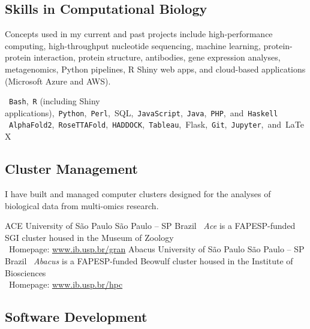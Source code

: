 \documentclass[11pt, letterpaper, sans]{moderncv}
\begin{document}


\subsection{Skills in Computational Biology}

Concepts used in my current and past projects include high-performance computing, high-throughput nucleotide sequencing, machine learning, protein-protein interaction, protein structure, antibodies, gene expression analyses, metagenomics, Python pipelines, R Shiny web apps, and cloud-based applications (Microsoft Azure and AWS).

\vspace{0.5em}

		{\small ~\texttt{Bash},~\texttt{R} (including Shiny applications),~\texttt{Python},~\texttt{Perl},~{SQL},~\texttt{JavaScript},~\texttt{Java},~\texttt{PHP},~and~\texttt{Haskell}}
        {\small ~\texttt{AlphaFold2},~\texttt{RoseTTAFold},~\texttt{HADDOCK},~\texttt{Tableau},~{Flask},~\texttt{Git},~\texttt{Jupyter},~and~\LaTeX}

\subsection{Cluster Management}

I have built and managed computer clusters designed for the analyses of biological data from multi-omics research.

		{ACE}
		{University of São Paulo}
		{São Paulo -- SP}
		{Brazil}
		{
			\textbullet~\emph{Ace} is a FAPESP-funded SGI cluster housed in the Museum of Zoology\\
			\textbullet~Homepage: \href{https://www.ib.usp.br/grant/anfibios/researchHPC.html}{www.ib.usp.br/gran}
		}
		{Abacus}
		{University of São Paulo}
		{São Paulo -- SP}
		{Brazil}
		{
			\textbullet~\emph{Abacus} is a FAPESP-funded Beowulf cluster housed in the Institute of Biosciences\\
			\textbullet~Homepage: \href{https://www.ib.usp.br/hpc/}{www.ib.usp.br/hpc}
		}

\subsection{Software Development}
\end{document}
